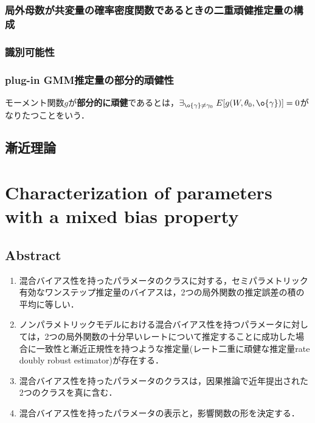 \documentclass[uplatex,dvipdfmx]{jsreport}
\begin{document}
\subsubsection{局外母数が共変量の確率密度関数であるときの二重頑健推定量の構成}

\subsubsection{識別可能性}

\begin{theorem}
    
\end{theorem}

\subsubsection{plug-in GMM推定量の部分的頑健性}

\begin{definition}
    モーメント関数$g$が\textbf{部分的に頑健}であるとは，$\exists_{\o{\gamma}\ne\gamma_0}\;E[g(W,\theta_0,\o{\gamma})]=0$がなりたつことをいう．
\end{definition}

\subsection{漸近理論}

\section{Characterization of parameters with a mixed bias property \cite{Rotnitzky-Smucler-Robins21-MixedBiasProperty}}

\begin{tcolorbox}[colframe=ForestGreen, colback=ForestGreen!10!white,breakable,colbacktitle=ForestGreen!40!white,coltitle=black,fonttitle=\bfseries\sffamily,
title=]
    
\end{tcolorbox}

\subsection{Abstract}

\begin{enumerate}
    \item 混合バイアス性を持ったパラメータのクラスに対する，セミパラメトリック有効なワンステップ推定量のバイアスは，2つの局外関数の推定誤差の積の平均に等しい．
    \item ノンパラメトリックモデルにおける混合バイアス性を持つパラメータに対しては，2つの局外関数の十分早いレートについて推定することに成功した場合に一致性と漸近正規性を持つような推定量(レート二重に頑健な推定量rate doubly robust estimator)が存在する．
    \item 混合バイアス性を持ったパラメータのクラスは，因果推論で近年提出された2つのクラスを真に含む．
    \item 混合バイアス性を持ったパラメータの表示と，影響関数の形を決定する．
\end{enumerate}
\end{document}
